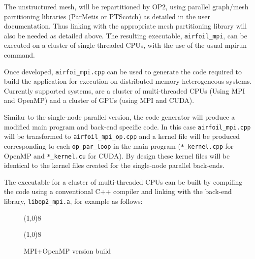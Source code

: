 \documentclass[11pt]{article}
\begin{document}
\noindent The unstructured mesh, will be repartitioned by OP2, using parallel graph/mesh partitioning libraries
(ParMetis or PTScotch) as detailed in the user documentation. Thus linking with the appropriate mesh partitioning
library will also be needed as detailed above. The resulting executable, \texttt{airfoil\_mpi}, can be executed on a
cluster of single threaded CPUs, with the use of the usual mpirun command. 

\newpage

Once developed, \texttt{airfoi\_mpi.cpp} can be used to generate the code required to build the application for
execution on distributed memory heterogeneous systems. Currently supported systems, are a cluster of multi-threaded CPUs
(Using MPI and OpenMP) and a cluster of GPUs (using MPI and CUDA).

Similar to the single-node parallel version, the code generator will produce a modified main program and back-end
specific code. In this case \texttt{airfoil\_mpi.cpp} will be transformed to \texttt{airfoil\_mpi\_op.cpp} and a kernel
file will be produced corresponding to each \texttt{op\_par\_loop} in the main program (\texttt{*\_kernel.cpp} for
OpenMP and \texttt{*\_kernel.cu} for CUDA). By design these kernel files will be identical to the kernel files created
for the single-node parallel back-ends. 

\noindent The executable for a cluster of multi-threaded CPUs can be built by compiling the code using a conventional
C++ compiler and linking with the back-end library, \texttt{libop2\_mpi.a}, for example as follows:

\begin{figure}[!h]\small
\vspace{-0pt}\noindent\line(1,0){8}\vspace{-20pt}
\vspace{-10pt}\noindent\line(1,0){8}\vspace{-10pt}
\caption{\small MPI+OpenMP version build }
\normalsize\vspace{-0pt}\label{fig:mpi_openmpbuild}
\end{figure}
\end{document}
